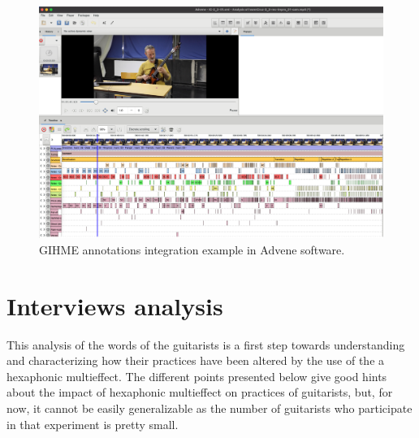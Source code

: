 \documentclass{article}
\begin{document}
\begin{figure}
    \centering
    \includegraphics[width=\columnwidth]{figures/IvannCruz_2_3_1_Advene.png}
    \caption{GIHME annotations integration example in Advene software.}
    \label{fig:Ivann-2_4-advene}
\end{figure}


    
    


\section{Interviews analysis}
\label{sec:analysis}

This analysis of the words of the guitarists is a first step towards understanding and characterizing how their practices have been altered by the use of the a hexaphonic multieffect.  
The different points presented below give good hints about the impact of hexaphonic multieffect on practices of guitarists, but, for now, it cannot be easily generalizable as the number of guitarists who participate in that experiment is pretty small.
\end{document}
